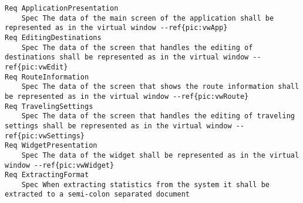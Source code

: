 

\begin{lstlisting}
Req ApplicationPresentation
	Spec The data of the main screen of the application shall be represented as in the virtual window --ref{pic:vwApp}
Req EditingDestinations
	Spec The data of the screen that handles the editing of destinations shall be represented as in the virtual window --ref{pic:vwEdit}
Req RouteInformation
	Spec The data of the screen that shows the route information shall be represented as in the virtual window --ref{pic:vwRoute}
Req TravelingSettings
	Spec The data of the screen that handles the editing of traveling settings shall be represented as in the virtual window --ref{pic:vwSettings}
Req WidgetPresentation
	Spec The data of the widget shall be represented as in the virtual window --ref{pic:vwWidget}
Req ExtractingFormat
	Spec When extracting statistics from the system it shall be extracted to a semi-colon separated document

\end{lstlisting}
